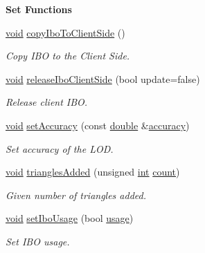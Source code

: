 \begin{Indent}{\bf Set Functions}\par
\begin{DoxyCompactItemize}
\item 
\hyperlink{group___u_a_v_objects_plugin_ga444cf2ff3f0ecbe028adce838d373f5c}{void} \hyperlink{class_g_l_c___lod_a9ca1f4eb80139231b4e7375eb01bb7dc}{copy\-Ibo\-To\-Client\-Side} ()
\begin{DoxyCompactList}\small\item\em Copy I\-B\-O to the Client Side. \end{DoxyCompactList}\item 
\hyperlink{group___u_a_v_objects_plugin_ga444cf2ff3f0ecbe028adce838d373f5c}{void} \hyperlink{class_g_l_c___lod_a2fab245eb3727da7c213af71c8310601}{release\-Ibo\-Client\-Side} (bool update=false)
\begin{DoxyCompactList}\small\item\em Release client I\-B\-O. \end{DoxyCompactList}\item 
\hyperlink{group___u_a_v_objects_plugin_ga444cf2ff3f0ecbe028adce838d373f5c}{void} \hyperlink{class_g_l_c___lod_a5594b270fafdd1d4c825040d5e88496a}{set\-Accuracy} (const \hyperlink{_super_l_u_support_8h_a8956b2b9f49bf918deed98379d159ca7}{double} \&\hyperlink{class_g_l_c___lod_a0fef13a35738091fec85fff5922cbf8c}{accuracy})
\begin{DoxyCompactList}\small\item\em Set accuracy of the L\-O\-D. \end{DoxyCompactList}\item 
\hyperlink{group___u_a_v_objects_plugin_ga444cf2ff3f0ecbe028adce838d373f5c}{void} \hyperlink{class_g_l_c___lod_a090f95f5ee935f820b79e08a27acfd9e}{triangles\-Added} (unsigned \hyperlink{ioapi_8h_a787fa3cf048117ba7123753c1e74fcd6}{int} \hyperlink{glext_8h_a5b40aca7a9682963dd00a8f5aef0a901}{count})
\begin{DoxyCompactList}\small\item\em Given number of triangles added. \end{DoxyCompactList}\item 
\hyperlink{group___u_a_v_objects_plugin_ga444cf2ff3f0ecbe028adce838d373f5c}{void} \hyperlink{class_g_l_c___lod_ac98b53bfabe166d3bd187ad300a385e3}{set\-Ibo\-Usage} (bool \hyperlink{glext_8h_ae759ed0394ed5353d8bef2fb755305da}{usage})
\begin{DoxyCompactList}\small\item\em Set I\-B\-O usage. \end{DoxyCompactList}\end{DoxyCompactItemize}
\end{Indent}
